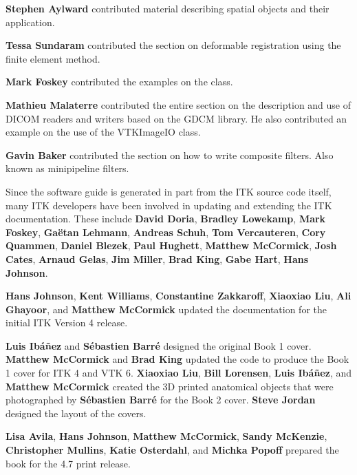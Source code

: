 {\bf Stephen Aylward} contributed material describing spatial objects and
their application.

{\bf Tessa Sundaram} contributed the section on deformable registration using
the finite element method.

{\bf Mark Foskey} contributed the examples on the
  class.

{\bf Mathieu Malaterre} contributed the entire section on the description and
use of DICOM readers and writers based on the GDCM library. He also contributed
an example on the use of the VTKImageIO class.

{\bf Gavin Baker} contributed the section on how to write composite filters.
Also known as minipipeline filters.

Since the software guide is generated in part from the ITK source code
itself, many ITK developers have been involved in updating and
extending the ITK documentation.  These include {\bf David Doria},
{\bf Bradley Lowekamp}, {\bf Mark Foskey}, {\bf Ga\"{e}tan Lehmann},
{\bf Andreas Schuh}, {\bf Tom Vercauteren}, {\bf Cory Quammen}, {\bf Daniel Blezek},
{\bf Paul Hughett}, {\bf Matthew McCormick}, {\bf Josh Cates}, {\bf Arnaud Gelas},
{\bf Jim Miller}, {\bf Brad King}, {\bf Gabe Hart}, {\bf Hans Johnson}.

{\bf Hans Johnson}, {\bf Kent Williams}, {\bf Constantine Zakkaroff}, {\bf
Xiaoxiao Liu}, {\bf Ali Ghayoor}, and {\bf Matthew McCormick} updated
the documentation for the initial ITK Version 4 release.

{\bf Luis Ib\'{a}\~{n}ez} and {\bf S\'{e}bastien Barr\'{e}} designed the
original Book 1 cover. {\bf Matthew McCormick} and {\bf Brad King} updated the
code to produce the Book 1 cover for ITK 4 and VTK 6. {\bf Xiaoxiao Liu},
{\bf Bill Lorensen}, {\bf Luis Ib\'{a}\~{n}ez}, and {\bf Matthew McCormick}
created the 3D printed anatomical objects that were photographed by {\bf
S\'{e}bastien Barr\'{e}} for the Book 2 cover. {\bf Steve Jordan} designed the
layout of the covers.

{\bf Lisa Avila}, {\bf Hans Johnson}, {\bf Matthew McCormick}, {\bf Sandy
McKenzie}, {\bf Christopher Mullins}, {\bf Katie Osterdahl}, and {\bf Michka
Popoff} prepared the book for the 4.7 print release.
